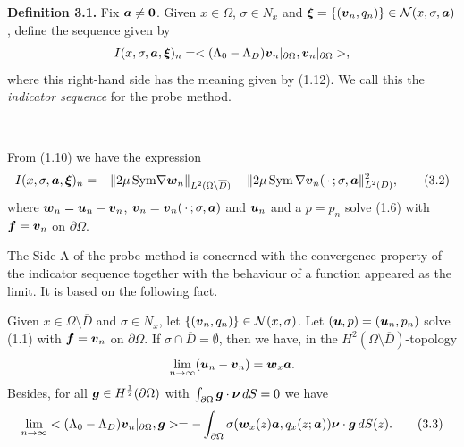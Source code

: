 {\bf\noindent Definition 3.1.}
Fix  $\mbox{\boldmath $a$}\not=\mbox{\boldmath $0$}$.
Given $x\in\Omega$, $\sigma\in N_x$ and
$\mbox{\boldmath $\xi$}=\{(\mbox{\boldmath $v$}_n, q_n)\}
\in {\cal N}(x,\sigma,\mbox{\boldmath $a$})$,
define the sequence given by
$$\displaystyle
I(x,\sigma, \mbox{\boldmath $a$},\mbox{\boldmath $\xi$})_n=
<(\Lambda_0-\Lambda_D)
\mbox{\boldmath $v$}_n\vert_{\partial\Omega},
\mbox{\boldmath $v$}_n\vert_{\partial\Omega}>,
$$
where this right-hand side has the meaning given by (1.12).
We call this the {\it indicator sequence} for the probe method.


$\quad$


From (1.10) we have the expression
$$\displaystyle
I(x,\sigma, \mbox{\boldmath $a$},\mbox{\boldmath $\xi$})_n
=-\Vert 2\mu\,\text{Sym}\nabla \mbox{\boldmath $w$}_n\Vert_{L^2(\Omega\setminus\overline D)}
-\Vert 2\mu\,\text{Sym}\,\nabla\mbox{\boldmath $v$}_n(\,\cdot\,;\sigma,\mbox{\boldmath $a$}\Vert_{L^2(D)}^2,
\tag {3.2}
$$
where $\mbox{\boldmath $w$}_n=\mbox{\boldmath $u$}_n-\mbox{\boldmath $v$}_n$,
$\mbox{\boldmath $v$}_n=\mbox{\boldmath $v$}_n(\,\cdot\,;\sigma,\mbox{\boldmath $a$})$ and $\mbox{\boldmath $u$}_n$
and a $p=p_n$ solve (1.6) with $\mbox{\boldmath $f$}=\mbox{\boldmath $v$}_n$ on $\partial\Omega$.



The Side A of the probe method is concerned with the convergence property
of the indicator sequence together with the behaviour of  a function appeared as the limit.
It is based on the following fact.





Given $x\in\Omega\setminus\overline{D}$ and $\sigma\in N_x$, let $\{(\mbox{\boldmath $v$}_n,q_n)\}\in {\cal N}(x,\sigma)$.
Let $(\mbox{\boldmath $u$},p)=(\mbox{\boldmath $u$}_n,p_n)$ solve (1.1) with $\mbox{\boldmath $f$}=\mbox{\boldmath $v$}_n$
on $\partial\Omega$.
If $\sigma\cap\overline{D}=\emptyset$, then we have, in the $H^2(\Omega\setminus\overline{D})$-topology
$$\displaystyle
\lim_{n\rightarrow\infty}(\mbox{\boldmath $u$}_n-\mbox{\boldmath $v$}_n)=\mbox{\boldmath $w$}_x\mbox{\boldmath $a$}.
$$
Besides, for all $\mbox{\boldmath $g$}\in H^{\frac{1}{2}}(\partial\Omega)$ with $\int_{\partial\Omega}\mbox{\boldmath $g$}\cdot\mbox{\boldmath $\nu$}\,dS=0$
we have
$$\displaystyle
\lim_{n\rightarrow\infty}<(\Lambda_0-\Lambda_D)\mbox{\boldmath $v$}_n\vert_{\partial\Omega},\mbox{\boldmath $g$}>
=-\int_{\partial\Omega}\sigma(\mbox{\boldmath $w$}_x(z)\mbox{\boldmath $a$}, q_x(z;\mbox{\boldmath $a$}))\mbox{\boldmath $\nu$}\cdot\mbox{\boldmath $g$}\,dS(z).
\tag {3.3}
$$




